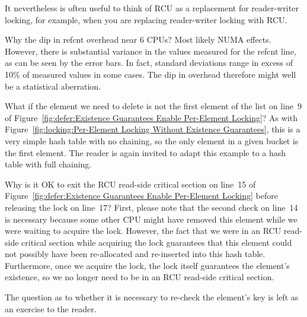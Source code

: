 \begin{enumerate}
	It nevertheless is often useful to think of RCU as a replacement
	for reader-writer locking, for example, when you are replacing
	reader-writer locking with RCU.

\QuickQ{}
	Why the dip in refcnt overhead near 6 CPUs?
\QuickA{}
	Most likely NUMA effects.
	However, there is substantial variance in the values measured for the
	refcnt line, as can be seen by the error bars.
	In fact, standard deviations range in excess of 10\% of measured
	values in some cases.
	The dip in overhead therefore might well be a statistical aberration.

\QuickQ{}
	What if the element we need to delete is not the first element
	of the list on line~9 of
	Figure~\ref{fig:defer:Existence Guarantees Enable Per-Element Locking}?
\QuickA{}
	As with
	Figure~\ref{fig:locking:Per-Element Locking Without Existence Guarantees},
	this is a very simple hash table with no chaining, so the only
	element in a given bucket is the first element.
	The reader is again invited to adapt this example to a hash table with
	full chaining.

\QuickQ{}
	Why is it OK to exit the RCU read-side critical section on
	line~15 of
	Figure~\ref{fig:defer:Existence Guarantees Enable Per-Element Locking}
	before releasing the lock on line~17?
\QuickA{}
	First, please note that the second check on line~14 is
	necessary because some other
	CPU might have removed this element while we were waiting
	to acquire the lock.
	However, the fact that we were in an RCU read-side critical section
	while acquiring the lock guarantees that this element could not
	possibly have been re-allocated and re-inserted into this
	hash table.
	Furthermore, once we acquire the lock, the lock itself guarantees
	the element's existence, so we no longer need to be in an
	RCU read-side critical section.

	The question as to whether it is necessary to re-check the
	element's key is left as an exercise to the reader.


\end{enumerate}

